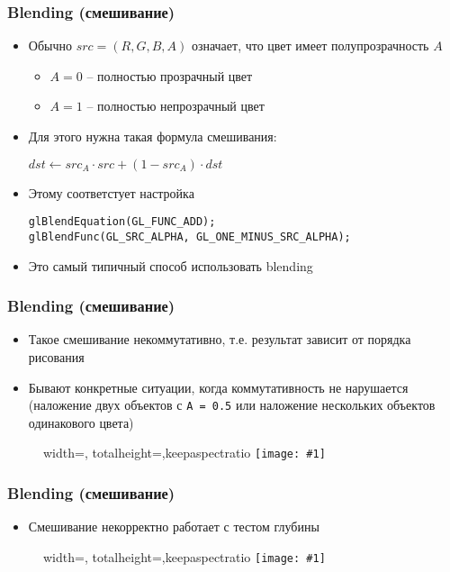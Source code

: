 \documentclass{beamer}
\newcommand{\slideimage}[1]{
  \begin{figure}
    \begin{adjustbox}{width=\textwidth, totalheight=\textheight-2\baselineskip-2\baselineskip,keepaspectratio}
      \texttt{[image: \#1]}
    \end{adjustbox}
  \end{figure}
}
\begin{document}
\begin{frame}[fragile]
\frametitle{Blending (смешивание)}
\begin{itemize}
\item Обычно \begin{math}src=(R,G,B,A)\end{math} означает, что цвет имеет полупрозрачность \begin{math}A\end{math}
\begin{itemize}
\item \begin{math}A=0\end{math} -- полностью прозрачный цвет
\item \begin{math}A=1\end{math} -- полностью непрозрачный цвет
\end{itemize}
\pause
\item Для этого нужна такая формула смешивания:
\begin{center}
\begin{math}
dst \leftarrow src_A \cdot src + (1 - src_A) \cdot dst
\end{math}
\end{center}
\pause
\item Этому соответстует настройка
\begin{verbatim}
glBlendEquation(GL_FUNC_ADD);
glBlendFunc(GL_SRC_ALPHA, GL_ONE_MINUS_SRC_ALPHA);
\end{verbatim}
\pause
\item Это самый типичный способ использовать blending
\end{itemize}
\end{frame}

\begin{frame}[fragile]
\frametitle{Blending (смешивание)}
\begin{itemize}
\item Такое смешивание некоммутативно, т.е. результат зависит от порядка рисования
\item Бывают конкретные ситуации, когда коммутативность не нарушается (наложение двух объектов с \verb|A = 0.5| или наложение нескольких объектов одинакового цвета)
\end{itemize}
\slideimage{two-squares.png}
\end{frame}

\begin{frame}[fragile]
\frametitle{Blending (смешивание)}
\begin{itemize}
\item Смешивание некорректно работает с тестом глубины
\end{itemize}
\slideimage{blending_incorrect_order.png}
\end{frame}
\end{document}
